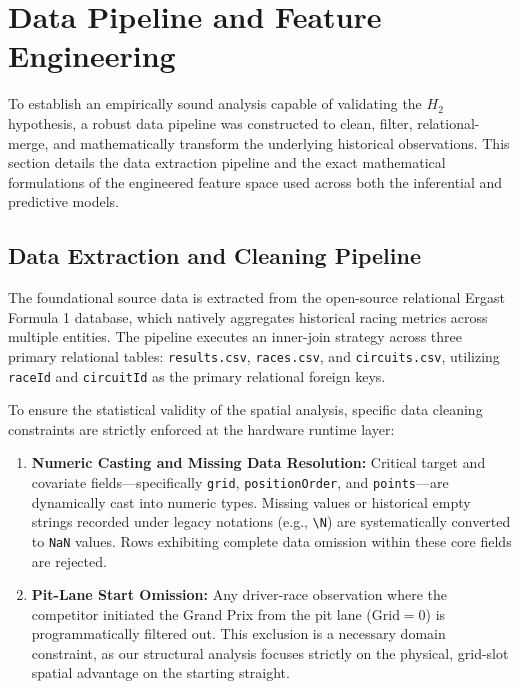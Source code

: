 \section{Data Pipeline and Feature Engineering}
\label{sec:data_pipeline}

To establish an empirically sound analysis capable of validating the $H_2$ hypothesis, a robust data pipeline was constructed to clean, filter, relational-merge, and mathematically transform the underlying historical observations. This section details the data extraction pipeline and the exact mathematical formulations of the engineered feature space used across both the inferential and predictive models.

\subsection{Data Extraction and Cleaning Pipeline}
\label{subsec:data_pipeline_detail}

The foundational source data is extracted from the open-source relational Ergast Formula 1 database, which natively aggregates historical racing metrics across multiple entities. The pipeline executes an inner-join strategy across three primary relational tables: \texttt{results.csv}, \texttt{races.csv}, and \texttt{circuits.csv}, utilizing \texttt{raceId} and \texttt{circuitId} as the primary relational foreign keys. 

To ensure the statistical validity of the spatial analysis, specific data cleaning constraints are strictly enforced at the hardware runtime layer:
\begin{enumerate}
    \item \textbf{Numeric Casting and Missing Data Resolution:} Critical target and covariate fields—specifically \texttt{grid}, \texttt{positionOrder}, and \texttt{points}—are dynamically cast into numeric types. Missing values or historical empty strings recorded under legacy notations (e.g., \texttt{\textbackslash N}) are systematically converted to \texttt{NaN} values. Rows exhibiting complete data omission within these core fields are rejected.
    \item \textbf{Pit-Lane Start Omission:} Any driver-race observation where the competitor initiated the Grand Prix from the pit lane ($\text{Grid} = 0$) is programmatically filtered out. This exclusion is a necessary domain constraint, as our structural analysis focuses strictly on the physical, grid-slot spatial advantage on the starting straight.
\end{enumerate}

